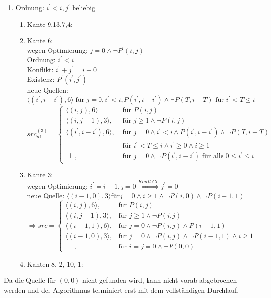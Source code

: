 \begin{enumerate}
      \item {Ordnung: \(i^\prime < i, j^\prime\) beliebig
          \begin{enumerate}
            \item Kante 9,13,7,4: -
            \item Kante 6: \\
              wegen Optimierung: \(j= 0 \land \neg P^\prime (i,j)\) \\
              Ordnung: \(i^\prime < i \) \\
              Konflikt: \( i^\prime + j^\prime = i + 0 \) \\
              Existenz: \( P^\prime(i^\prime, j^\prime) \) \\
              neue Quellen: \( \langle ( i^\prime, i-i^\prime ), 6 \rangle \text{ für } j=0, i^\prime < i , P(i^\prime, i - i ^\prime) \land \neg P(T, i-T) \text{ für } i^\prime < T \leq i \) \\

\( src^{(3)}_{n1} =
\begin{cases}
  \langle (i,j), 6 \rangle, & \mbox{ für } P(i,j) \\
  \langle (i,j-1), 3 \rangle, & \mbox{ für } j \geq 1 \land \neg P (i,j) \\
  \langle (i^\prime, i-i^\prime),6 \rangle, & \mbox{ für } j=0 \land i^\prime < i \land P(i^\prime, i - i^\prime) \land \neg P(T,i-T) \\ & \mbox{ für } i^\prime < T \leq i \land i^\prime \geq 0 \land i \geq 1 \\
  \perp, & \mbox{ für } j=0 \land \neg P(i^\prime, i - i^\prime) \text{ für alle } 0 \leq i^\prime \leq i
\end{cases} \)

\item Kante 3:\\
  wegen Optimierung: \( i^\prime = i - 1, j=0 \stackrel{Konfl. Gl.}{\Rightarrow} j^\prime = 0\) \\
  neue Quelle: \( \langle (i-1,0), 3 \rangle \text{für} j=0 \land i \geq 1 \land \neg P(i,0) \land \neg P(i-1,1) \) \\
\( \Rightarrow src =
\begin{cases}
  \langle (i, j), 6 \rangle, & \mbox{für } P(i,j) \\
  \langle (i, j-1), 3 \rangle, & \mbox{für } j \geq 1 \land \neg P(i,j) \\
  \langle (i-1, 1), 6 \rangle, & \mbox{für } j=0 \land \neg P(i,j) \land P(i-1,1) \\
  \langle (i-1, 0), 3 \rangle, & \mbox{für } j=0 \land \neg P(i,j) \land \neg P(i-1,1) \land i \geq 1 \\
  \perp, & \mbox{für } i=j=0 \land \neg P(0,0)
\end{cases}
\)
\item Kanten 8, 2, 10, 1: -
           \end{enumerate}
           }

\end{enumerate}
Da die Quelle für \( (0,0) \) nicht gefunden wird, kann nicht vorab abgebrochen werden und der Algorithmus terminiert erst mit dem vollständigen Durchlauf.

